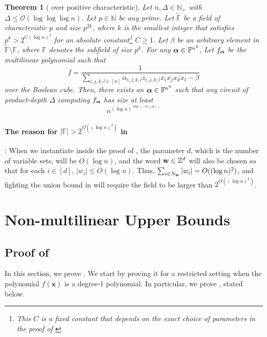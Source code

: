 \documentclass[11pt]{article}
\newtheorem{theorem}{Theorem}[section]
\newcommand{\F}{\mathbb{F}}
\begin{document}
\begin{theorem}[\cite{GHT} over positive characteristic]\label{thm: ght positive char}
Let $n, \Delta \in \mathbb{N}_{+}$ with $\Delta \leq \mathcal{O}(\log\log\log n)$. Let $p\in \mathbb{N}$ be any prime. Let $\tilde{\F}$ be a field of characteristic $p$ and size $p^{2k}$, where $k$ is the smallest integer that satisfies $p^k > 2^{C(\log n)^2}$ for an absolute constant\footnote{This $C$ is a fixed constant that depends on the exact choice of parameters in the proof of \cite{GHT}} $C\geq1$. Let $\beta$ be an arbitrary element in $\tilde{\F}\setminus\F$, where $\F$ denotes the subfield of size $p^k$. For any $\bfalpha \in \F^{n^4}$, Let $f_{\boldsymbol{\alpha}}$ be the multilinear polynomial such that $$ f = \frac{1}{\sum_{i,j,k,l\in[n]}\alpha_{i,j,k,l}z_{i,j,k,l}x_ix_jx_kx_l - \beta}$$
over the Boolean cube. Then, there exists an $\bfalpha \in \F^{n^4}$ such that any circuit of product-depth $\Delta$ computing $f_{\boldsymbol{\alpha}}$ has size at least $$n^{(\log n)^{\exp(-\mathcal{O}(\Delta))}}$$    
\end{theorem}
\paragraph{The reason for $|\F|>2^{\Omega((\log n)^2)}$ in }: When we instantiate  inside the proof of , the parameter $d$, which is the number of variable sets, will be $O(\log n)$, and the word $\mathbf{w} \in \mathbb{Z}^d$ will also be chosen so that for each $i\in [d]$, $|w_i|\leq O(\log n)$. Thus, $\sum_{i\in N_{\mathbf{w}}}|w_i| = O((\log n)^2)$, and fighting the union bound in  will require the field to be larger than $2^{O((\log n)^2)}$. 



\section{Non-multilinear Upper Bounds}

\subsection{Proof of }
In this section, we prove . We start by proving it for a restricted setting when the polynomial $f(\mathbf{x})$ is a degree-$1$ polynomial. In particular, we prove , stated below.
\end{document}
